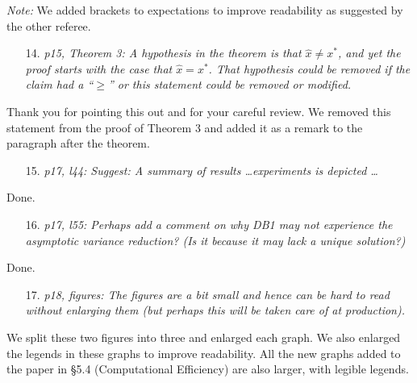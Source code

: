 \documentclass[11pt,notitlepage,onecolumn]{article}
\newcommand{\noi}{\noindent}
\begin{document}
\noi 
{\it Note:} We added brackets to expectations to improve readability as suggested by the other referee.
\medskip 


\begin{itemize}
\item[14.] \textit{p15, Theorem 3: A hypothesis in the theorem is that $\hat{x} \neq x^*$, and yet the proof starts with the case that $\hat{x} = x^*$. 
That hypothesis could be removed if the claim had a ``$\geq$'' or this statement could be removed or modified.}
\end{itemize}

\noindent Thank you for pointing this out and for your careful review.  
We removed this statement from the proof of Theorem 3 and added it as a remark to the paragraph after the theorem.
\medskip 



\begin{itemize}
\item[15.] \textit{p17, l44: Suggest: A summary of results \ldots experiments is depicted \ldots}
\end{itemize}

\noindent 
Done.
\medskip 


\begin{itemize}
\item[16.] \textit{p17, l55: Perhaps add a comment on why DB1 may not experience the asymptotic variance reduction? 
(Is it because it may lack a unique solution?)}
\end{itemize}

\noindent
Done.
\medskip 


\begin{itemize}
\item[17.] \textit{p18, figures: The figures are a bit small and hence can be hard to read without enlarging them (but perhaps this will be taken care of at production).}
\end{itemize}

\noindent 
We split these two figures into three and enlarged each graph. 
We also enlarged the legends in these graphs to improve readability.
All the new graphs added to the paper in \S 5.4 (Computational Efficiency) are also larger, with legible legends. 
\medskip 
\end{document}
